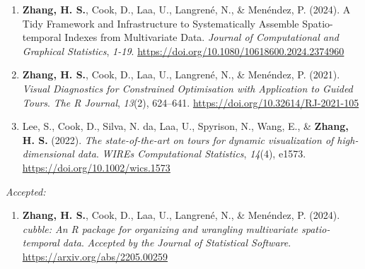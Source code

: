 \documentclass[10pt,a4paper]{article} %
\begin{document}
\vspace{-1em}
\begin{enumerate}[itemsep=0.1em]

    \item \textbf{Zhang, H. S.}, Cook, D., Laa, U., Langren\'e, N., \& Men\'endez, P. (2024). 
    A Tidy Framework and Infrastructure to Systematically Assemble Spatio-temporal Indexes 
    from Multivariate Data. \emph{Journal of Computational and Graphical Statistics}, 
    \emph{1-19}. \url{https://doi.org/10.1080/10618600.2024.2374960}
    
    \item \textbf{Zhang, H. S.}, Cook, D., Laa, U., Langren\'e, N., \& Men\'endez, P. (2021). 
    \textit{Visual Diagnostics for Constrained Optimisation with Application to Guided Tours}. 
    \emph{The R Journal}, \emph{13}(2), 624--641. \url{https://doi.org/10.32614/RJ-2021-105}
    
    \item Lee, S., Cook, D., Silva, N. da, Laa, U., Spyrison, N., Wang, E., \& 
    \textbf{Zhang, H. S.} (2022). \textit{The state-of-the-art on tours for 
    dynamic visualization of high-dimensional data}. \emph{WIREs Computational Statistics}, 
    \emph{14}(4), e1573. \url{https://doi.org/10.1002/wics.1573}

\end{enumerate}

\noindent\textit{Accepted:}\vspace{-0.5em}
\begin{enumerate}[resume]

    \item \textbf{Zhang, H. S.}, Cook, D., Laa, U., Langren\'e, N., \& Men\'endez, P. (2024). 
    \textit{cubble: An R package for organizing and wrangling multivariate spatio-temporal data}. 
    \emph{Accepted by the Journal of Statistical Software}. 
    \url{https://arxiv.org/abs/2205.00259}

\end{enumerate}


\end{document}
